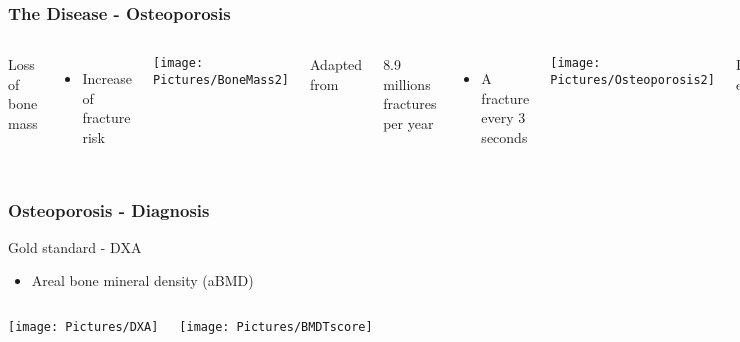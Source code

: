 \documentclass[xcolor=table,11pt]{beamer}
\begin{document}
	\begin{frame}[noframenumbering]
		\frametitle{The Disease - Osteoporosis}

		\begin{columns}
			Loss of bone mass
			\begin{itemize}
				\item Increase of fracture risk
			\end{itemize}

			\vspace{5mm}

			\texttt{[image: Pictures/BoneMass2]}\\
			\begin{center}
				\tiny{Adapted from \cite{p1}}
			\end{center}

			8.9 millions fractures per year
			\begin{itemize}
				\item A fracture every 3 seconds
			\end{itemize}

			\vspace{5mm}

			\texttt{[image: Pictures/Osteoporosis2]}\\
			\begin{center}
				\tiny{Image from eurospinepatientline.org}
			\end{center}

		\end{columns}

	\end{frame}

	\begin{frame}
		\frametitle{Osteoporosis - Diagnosis}

		Gold standard - DXA
		\begin{itemize}
			\item Areal bone mineral density (aBMD)
		\end{itemize}

		\begin{columns}
			\column{0.4\linewidth}
			\centering
			\texttt{[image: Pictures/DXA]}\\
			\tiny{\cite{p2}}

			\column{0.55\linewidth}
			\centering
			\texttt{[image: Pictures/BMDTscore]}\\
			\tiny{\cite{p3}}

		\end{columns}

	\end{frame}
\end{document}
